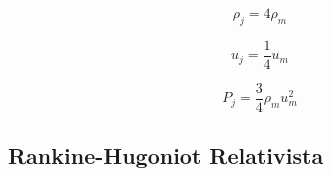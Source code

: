\documentclass[12pt,a4paper]{book}
\begin{document}
\begin{equation}
\rho_j = 4 \rho_m
\end{equation}

\begin{equation}
u_j = \frac{1}{4} u_m
\end{equation}

\begin{equation}
P_{j} = \frac{3}{4}\rho_m u_m^{2}
\end{equation}




\subsection{Rankine-Hugoniot Relativista}











\end{document}
